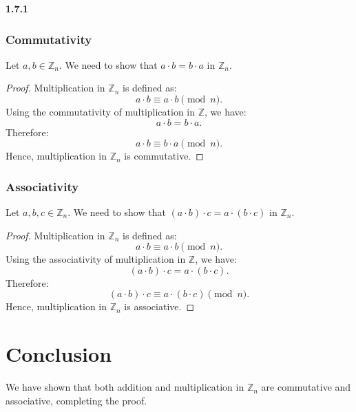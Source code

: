 \documentclass[12pt]{amsart}
\theoremstyle{definition}
\numberwithin{equation}{section}
\begin{document}
\begin{exercise}{\textbf{1.7.1}}
\subsubsection*{Commutativity}
Let \(a, b \in \mathbb{Z}_n\). We need to show that \(a \cdot b = b \cdot a\) in \(\mathbb{Z}_n\).
\begin{proof}
Multiplication in \(\mathbb{Z}_n\) is defined as:
\[
a \cdot b \equiv a \cdot b \pmod{n}.
\]
Using the commutativity of multiplication in \(\mathbb{Z}\), we have:
\[
a \cdot b = b \cdot a.
\]
Therefore:
\[
a \cdot b \equiv b \cdot a \pmod{n}.
\]
Hence, multiplication in \(\mathbb{Z}_n\) is commutative.
\end{proof}

\subsubsection*{Associativity}
Let \(a, b, c \in \mathbb{Z}_n\). We need to show that \((a \cdot b) \cdot c = a \cdot (b \cdot c)\) in \(\mathbb{Z}_n\).
\begin{proof}
Multiplication in \(\mathbb{Z}_n\) is defined as:
\[
a \cdot b \equiv a \cdot b \pmod{n}.
\]
Using the associativity of multiplication in \(\mathbb{Z}\), we have:
\[
(a \cdot b) \cdot c = a \cdot (b \cdot c).
\]
Therefore:
\[
(a \cdot b) \cdot c \equiv a \cdot (b \cdot c) \pmod{n}.
\]
Hence, multiplication in \(\mathbb{Z}_n\) is associative.
\end{proof}

\section*{Conclusion}
We have shown that both addition and multiplication in \(\mathbb{Z}_n\) are commutative and associative, completing the proof.

\end{exercise}
\newpage
\end{document}
